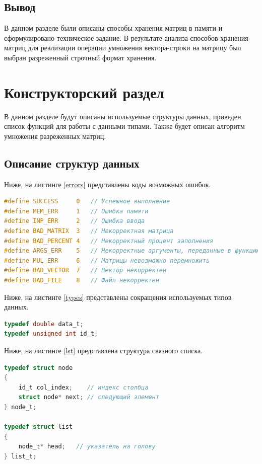 \section{Вывод}

В данном разделе были описаны способы хранения матриц в памяти и сформулировано техническое задание. В результате анализа способов хранения матриц для реализации операции умножения вектора-строки на матрицу был выбран разреженный строчный формат хранения.


\chapter{Конструкторский раздел}

В данном разделе будут описаны используемые структуры данных, приведен список функций для работы с данными типами. Также будет описан алгоритм умножения разреженных матриц.


\section{Описание структур данных}

Ниже, на листинге \ref{errors} представлены коды возможных ошибок.

\begin{lstlisting}[label=errors,language=C,caption=Коды ошибок]
#define SUCCESS     0   // Успешное выполнение
#define MEM_ERR     1   // Ошибка памяти
#define INP_ERR     2   // Ошибка ввода
#define BAD_MATRIX  3   // Некорректная матрица
#define BAD_PERCENT 4   // Некорректный процент заполнения
#define ARGS_ERR    5   // Некорректные аргументы, переданные в функцию
#define MUL_ERR     6   // Матрицы невозможно перемножить
#define BAD_VECTOR  7   // Вектор некорректен
#define BAD_FILE    8   // Файл некорректен
\end{lstlisting}

Ниже, на листинге \ref{types} представлены сокращения используемых типов данных.

\begin{lstlisting}[label=types,language=C,caption=Используемые типы]
typedef double data_t;
typedef unsigned int id_t;
\end{lstlisting}

Ниже, на листинге \ref{lst} представлена структура связного списка.

\begin{lstlisting}[label=lst,language=C,caption=Связный список и функции для работы с ним]
typedef struct node
{
	id_t col_index;    // индекс столбца
	struct node* next; // следующий элемент
} node_t;

typedef struct list
{
	node_t* head;   // указатель на голову
} list_t;
\end{lstlisting}

